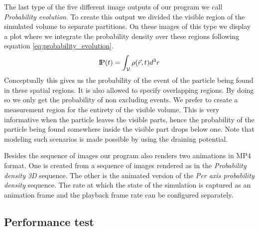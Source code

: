 The last type of the five different image outputs of our program we call \textit{Probability evolution}.
To create this output we divided the visible region of the simulated volume to separate partitions.
On these images of this type we display a plot where we integrate the probability density over these regions following equation \ref{eq:probability_evolution}.
\begin{equation}
	\text{I\kern-0.15em P}(t)=\int_\mathcal{V}\rho(\vec{r},t)d^3r
	\label{eq:probability_evolution}
\end{equation}
Conceptually this gives us the probability of the event of the particle being found in these spatial regions.
It is also allowed to specify overlapping regions.
By doing so we only get the probability of non excluding events.
We prefer to create a measurement region for the entirety of the visible volume.
This is very informative when the particle leaves the visible parts, hence the probability of the particle being found somewhere inside the visible part drops below one.
Note that modeling such scenarios is made possible by using the draining potential.

Besides the sequence of images our program also renders two animations in MP4 format.
One is created from a sequence of images rendered as in the \textit{Probability density 3D} sequence.
The other is the animated version of the \textit{Per axis probability density} sequence.
The rate at which the state of the simulation is captured as an animation frame and the playback frame rate can be configured separately.

\subsection{Performance test}

